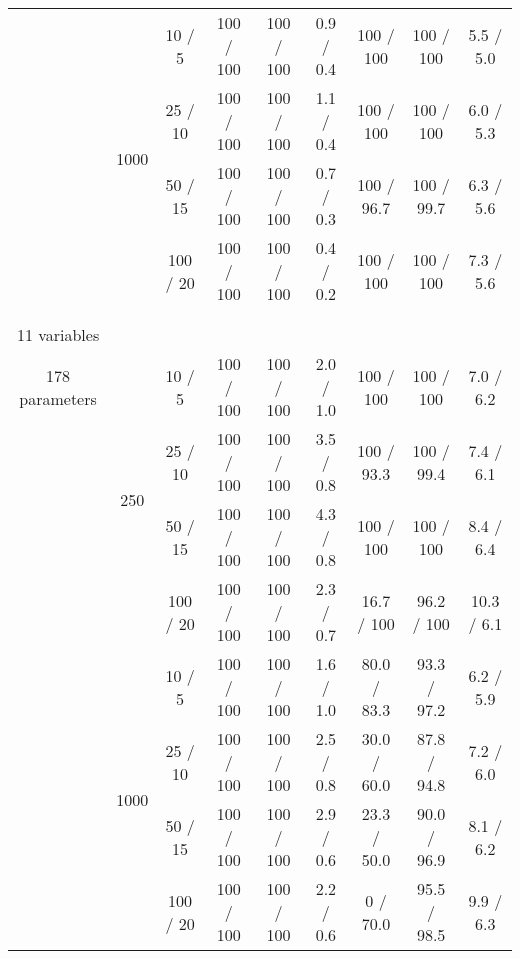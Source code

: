 \documentclass[twoside,11pt]{article}
\begin{document}
\begin{table}[H]
\begin{tabular}{  c | c | c || c | c | c || c | c | c }
& \multirow{4}{*}{1000}

& 10 / 5 & 100 / 100 & 100 / 100 & 0.9 / 0.4 & 100 / 100 & 100 / 100 & 5.5 / 5.0  \\

& & 25 / 10 & 100 / 100 & 100 / 100 & 1.1 / 0.4 & 100 / 100 & 100 / 100 & 6.0 / 5.3 \\
	
& & 50 / 15 & 100 / 100 & 100 / 100 & 0.7 / 0.3 & \cellcolor{yellow!100} 100 / 96.7 & \cellcolor{yellow!100} 100 / 99.7 & 6.3 / 5.6 \\

& & 100 / 20 & 100 / 100 & 100 / 100 & 0.4 / 0.2 & 100 / 100 & 100 / 100 & 7.3 / 5.6 \\

\hhline {=|=|=||=|=|=||=|=|=}


\multirow{8}{*}{\thead{\textbf{sachs} \\ \\ 11 variables \\ 178 parameters}} & \multirow{4}{*}{250} 

& 10 / 5  & 100 / 100 & 100 / 100 & 2.0 / 1.0 & 100 / 100 & 100 / 100 & 7.0 / 6.2 \\

& & 25 / 10 & 100 / 100 & 100 / 100 & 3.5 / 0.8 & \cellcolor{yellow!100} 100 / 93.3 & \cellcolor{yellow!100} 100 / 99.4 & 7.4 / 6.1  \\
	
& & 50 / 15 & 100 / 100 & 100 / 100 & 4.3 / 0.8 & 100 / 100 & 100 / 100 & 8.4 / 6.4  \\

& & 100 / 20 & 100 / 100 & 100 / 100 & 2.3 / 0.7 & \cellcolor{yellow!100} 16.7 / 100 & \cellcolor{yellow!100}  96.2 / 100 & 10.3 / 6.1 \\

\hhline {~|-|-||-|-|-||-|-|-}

& \multirow{4}{*}{1000}

& 10 / 5 & 100 / 100 & 100 / 100 & 1.6 / 1.0 & \cellcolor{yellow!100} 80.0 / 83.3 & \cellcolor{yellow!100} 93.3 / 97.2 & 6.2 / 5.9 \\

& & 25 / 10 & 100 / 100  & 100 / 100 & 2.5 / 0.8 & \cellcolor{yellow!100} 30.0 / 60.0 & \cellcolor{yellow!100} 87.8 / 94.8 & 7.2 / 6.0 \\
	
& & 50 / 15 & 100 / 100 & 100 / 100  &  2.9 / 0.6 & \cellcolor{yellow!100} 23.3 / 50.0 & \cellcolor{yellow!100} 90.0 / 96.9 & 8.1 / 6.2 \\

& & 100 / 20 & 100 / 100 & 100 / 100 & 2.2 / 0.6 & \cellcolor{yellow!100} 0 / 70.0 & \cellcolor{yellow!100} 95.5 / 98.5 & 9.9 / 6.3 \\


\end{tabular}
\end{table}
\end{document}
